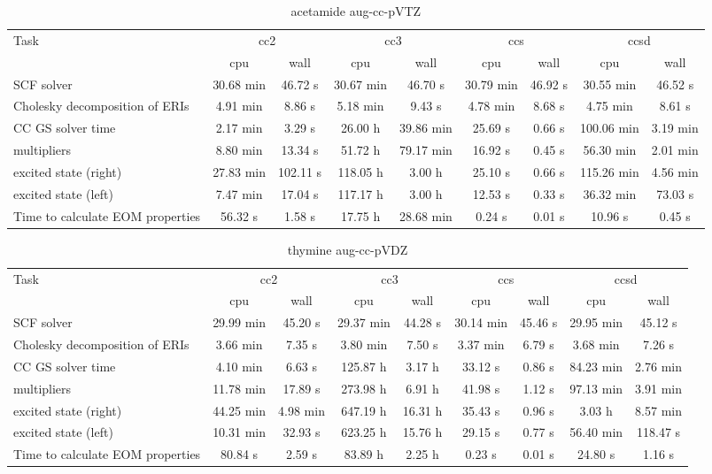 \documentclass{article}
\begin{document}
\begin{table}
\caption{acetamide aug-cc-pVTZ}
\begin{tabular}{lcccccccc}
\toprule
Task & \multicolumn{2}{c}{cc2} & \multicolumn{2}{c}{cc3} & \multicolumn{2}{c}{ccs} & \multicolumn{2}{c}{ccsd}\\
\cmidrule(lr){2-3}\cmidrule(lr){4-5}\cmidrule(lr){6-7}\cmidrule(lr){8-9}
 & cpu & wall & cpu & wall & cpu & wall & cpu & wall\\
\midrule
SCF solver & 30.68 min & 46.72 s & 30.67 min & 46.70 s & 30.79 min & 46.92 s & 30.55 min & 46.52 s\\
Cholesky decomposition of ERIs & 4.91 min & 8.86 s & 5.18 min & 9.43 s & 4.78 min & 8.68 s & 4.75 min & 8.61 s\\
CC GS solver time & 2.17 min & 3.29 s & 26.00 h & 39.86 min & 25.69 s & 0.66 s & 100.06 min & 3.19 min\\
multipliers & 8.80 min & 13.34 s & 51.72 h & 79.17 min & 16.92 s & 0.45 s & 56.30 min & 2.01 min\\
excited state (right) & 27.83 min & 102.11 s & 118.05 h & 3.00 h & 25.10 s & 0.66 s & 115.26 min & 4.56 min\\
excited state (left) & 7.47 min & 17.04 s & 117.17 h & 3.00 h & 12.53 s & 0.33 s & 36.32 min & 73.03 s\\
Time to calculate EOM properties & 56.32 s & 1.58 s & 17.75 h & 28.68 min & 0.24 s & 0.01 s & 10.96 s & 0.45 s\\
\bottomrule
\end{tabular}
\end{table}
\begin{table}
\caption{thymine aug-cc-pVDZ}
\begin{tabular}{lcccccccc}
\toprule
Task & \multicolumn{2}{c}{cc2} & \multicolumn{2}{c}{cc3} & \multicolumn{2}{c}{ccs} & \multicolumn{2}{c}{ccsd}\\
\cmidrule(lr){2-3}\cmidrule(lr){4-5}\cmidrule(lr){6-7}\cmidrule(lr){8-9}
 & cpu & wall & cpu & wall & cpu & wall & cpu & wall\\
\midrule
SCF solver & 29.99 min & 45.20 s & 29.37 min & 44.28 s & 30.14 min & 45.46 s & 29.95 min & 45.12 s\\
Cholesky decomposition of ERIs & 3.66 min & 7.35 s & 3.80 min & 7.50 s & 3.37 min & 6.79 s & 3.68 min & 7.26 s\\
CC GS solver time & 4.10 min & 6.63 s & 125.87 h & 3.17 h & 33.12 s & 0.86 s & 84.23 min & 2.76 min\\
multipliers & 11.78 min & 17.89 s & 273.98 h & 6.91 h & 41.98 s & 1.12 s & 97.13 min & 3.91 min\\
excited state (right) & 44.25 min & 4.98 min & 647.19 h & 16.31 h & 35.43 s & 0.96 s & 3.03 h & 8.57 min\\
excited state (left) & 10.31 min & 32.93 s & 623.25 h & 15.76 h & 29.15 s & 0.77 s & 56.40 min & 118.47 s\\
Time to calculate EOM properties & 80.84 s & 2.59 s & 83.89 h & 2.25 h & 0.23 s & 0.01 s & 24.80 s & 1.16 s\\
\bottomrule
\end{tabular}
\end{table}
\end{document}
